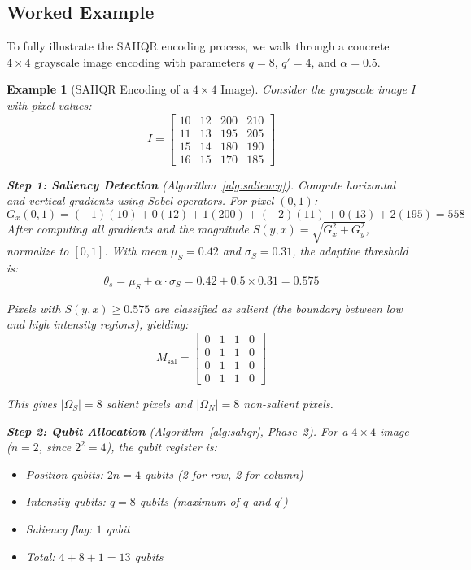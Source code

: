 \documentclass{ipol}
\newtheorem{example}{Example}
\begin{document}
\FloatBarrier
\subsection{Worked Example}

To fully illustrate the SAHQR encoding process, we walk through a concrete $4 \times 4$ grayscale image encoding with parameters $q = 8$, $q' = 4$, and $\alpha = 0.5$.

\begin{example}[SAHQR Encoding of a $4 \times 4$ Image]
Consider the grayscale image $I$ with pixel values:
$$
I = \begin{bmatrix}
10 & 12 & 200 & 210 \\
11 & 13 & 195 & 205 \\
15 & 14 & 180 & 190 \\
16 & 15 & 170 & 185
\end{bmatrix}
$$

\textbf{Step 1: Saliency Detection} (Algorithm~\ref{alg:saliency}).
Compute horizontal and vertical gradients using Sobel operators. For pixel $(0,1)$:
$$G_x(0,1) = (-1)(10) + 0(12) + 1(200) + (-2)(11) + 0(13) + 2(195) = 558$$
After computing all gradients and the magnitude $S(y,x) = \sqrt{G_x^2 + G_y^2}$, normalize to $[0,1]$. With mean $\mu_S = 0.42$ and $\sigma_S = 0.31$, the adaptive threshold is:
$$\theta_s = \mu_S + \alpha \cdot \sigma_S = 0.42 + 0.5 \times 0.31 = 0.575$$

Pixels with $S(y,x) \geq 0.575$ are classified as salient (the boundary between low and high intensity regions), yielding:
$$M_{\text{sal}} = \begin{bmatrix} 0 & 1 & 1 & 0 \\ 0 & 1 & 1 & 0 \\ 0 & 1 & 1 & 0 \\ 0 & 1 & 1 & 0 \end{bmatrix}$$

This gives $|\Omega_S| = 8$ salient pixels and $|\Omega_N| = 8$ non-salient pixels.

\textbf{Step 2: Qubit Allocation} (Algorithm~\ref{alg:sahqr}, Phase~2).
For a $4 \times 4$ image ($n = 2$, since $2^2 = 4$), the qubit register is:
\begin{itemize}
\item Position qubits: $2n = 4$ qubits (2 for row, 2 for column)
\item Intensity qubits: $q = 8$ qubits (maximum of $q$ and $q'$)
\item Saliency flag: $1$ qubit
\item Total: $4 + 8 + 1 = 13$ qubits
\end{itemize}


\end{example}
\end{document}
